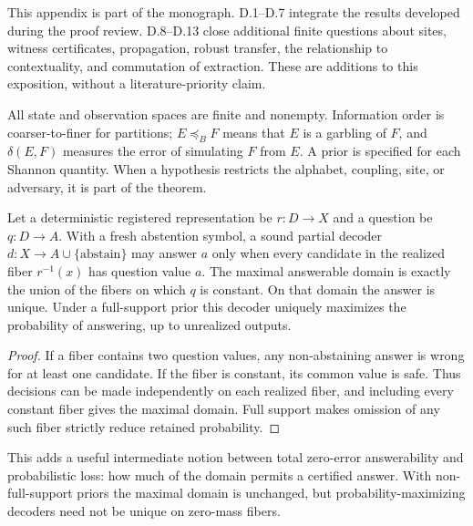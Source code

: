 
This appendix is part of the monograph. D.1--D.7 integrate the results developed during the proof review. D.8--D.13 close additional finite questions about sites, witness certificates, propagation, robust transfer, the relationship to contextuality, and commutation of extraction. These are additions to this exposition, without a literature-priority claim.

All state and observation spaces are finite and nonempty. Information order is coarser-to-finer for partitions; \(E\preceq_B F\) means that \(E\) is a garbling of \(F\), and \(\delta(E,F)\) measures the error of simulating \(F\) from \(E\). A prior is specified for each Shannon quantity. When a hypothesis restricts the alphabet, coupling, site, or adversary, it is part of the theorem.


\begin{thmplain}

Let a deterministic registered representation be \(r:D\to X\) and a question be \(q:D\to A\). With a fresh abstention symbol, a sound partial decoder \(d:X\to A\cup\{\mathrm{abstain}\}\) may answer \(a\) only when every candidate in the realized fiber \(r^{-1}(x)\) has question value \(a\). The maximal answerable domain is exactly the union of the fibers on which \(q\) is constant. On that domain the answer is unique. Under a full-support prior this decoder uniquely maximizes the probability of answering, up to unrealized outputs.
\end{thmplain}

\begin{proof}

If a fiber contains two question values, any non-abstaining answer is wrong for at least one candidate. If the fiber is constant, its common value is safe. Thus decisions can be made independently on each realized fiber, and including every constant fiber gives the maximal domain. Full support makes omission of any such fiber strictly reduce retained probability.
\end{proof}

This adds a useful intermediate notion between total zero-error answerability and probabilistic loss: how much of the domain permits a certified answer. With non-full-support priors the maximal domain is unchanged, but probability-maximizing decoders need not be unique on zero-mass fibers.


